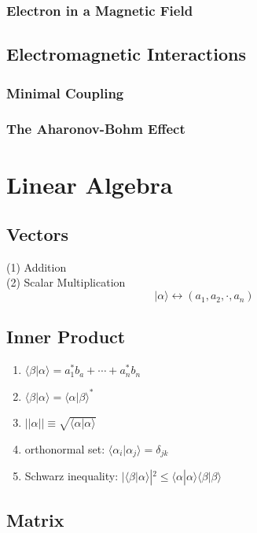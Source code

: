 \documentclass[a4paper,12pt]{article}
\begin{document}
\subsubsection{Electron in a Magnetic Field}
\subsection{Electromagnetic Interactions}
\subsubsection{Minimal Coupling}
\subsubsection{The Aharonov-Bohm Effect}





\newpage 

\section{Linear Algebra}
\subsection{Vectors}

(1) Addition \\
(2) Scalar Multiplication
\[ |\alpha\rangle \leftrightarrow (a_1,a_2,\cdot,a_n)\]
\subsection{Inner Product}
\begin{enumerate}
       \item \( \langle \beta|\alpha \rangle = a_1^*b_a+\cdots + a_n^*b_n\)
       \item \( \langle \beta|\alpha \rangle = \langle \alpha|\beta \rangle^* \) 
       \item \( ||\alpha|| \equiv \sqrt{\langle \alpha|\alpha \rangle}\)
       \item orthonormal set: \(\langle \alpha_i|\alpha_j \rangle =\delta_{jk}\)
       \item Schwarz inequality: \( |\langle \beta|\alpha \rangle|^2 \leq \langle \alpha|\alpha \rangle \langle \beta|\beta \rangle \)
\end{enumerate}
\subsection{Matrix}
\end{document}
